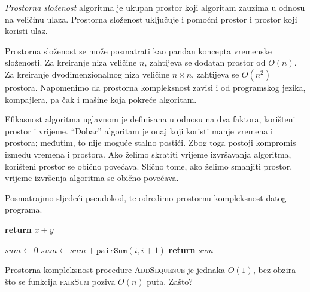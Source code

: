  \textit{Prostorna složenost} algoritma je ukupan prostor koji algoritam zauzima u odnosu na veličinu ulaza. Prostorna složenost   uključuje i pomoćni prostor i prostor koji koristi ulaz.
 
 Prostorna složenost se može posmatrati kao pandan koncepta vremenske složenosti. Za kreiranje niza veličine $n$, zahtijeva se dodatan prostor od $O(n)$. Za kreiranje dvodimenzionalnog niza veličine $n \times n$,  zahtijeva se $O(n^2)$ prostora.
 Napomenimo da prostorna kompleksnost zavisi i od programskog jezika, kompajlera, pa  čak i mašine koja pokreće algoritam.
 
 
 Efikasnost algoritma uglavnom je definisana u odnosu na  dva faktora, korišteni prostor i vrijeme. ``Dobar'' algoritam je onaj koji koristi manje vremena i prostora; međutim, to nije moguće stalno postići. Zbog toga postoji kompromis između vremena i prostora. Ako želimo skratiti vrijeme izvršavanja algoritma, korišteni prostor se obično povećava. Slično tome, ako želimo smanjiti prostor, vrijeme izvršenja algoritma se obično povećava. %
 
 
 \begin{example}
 	Posmatrajmo sljedeći pseudokod, te odredimo prostornu kompleksnost datog 
 	programa. 
 	
 	
 	\begin{algorithm}[H]
 		\begin{algorithmic}[1]
 			\State	\textbf{return} $x+y$
 			\EndProcedure
 			
 		\end{algorithmic}
 	\end{algorithm}        
 	
 	
 	\begin{algorithm}[H]
 		\begin{algorithmic}[1]
 			
 			\State $sum \gets 0$
 			\State $sum \gets sum + \texttt{pairSum}(i, i+1)$
 			\EndFor
 			\State \textbf{return} \textit{sum}~
 			\EndProcedure
 			
 		\end{algorithmic}
 	\end{algorithm}
 	
 	Prostorna kompleksnost procedure \textsc{AddSequence} je jednaka $O(1)$, bez obzira što se funkcija \textsc{pairSum} poziva $O(n)$ puta. Zašto?
 	
 	
 \end{example}
 
